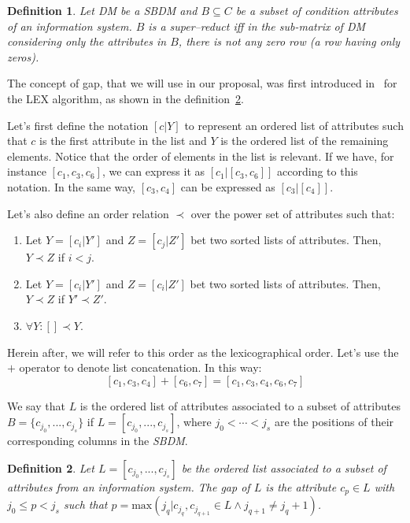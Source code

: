 \documentclass[number,preprint,review,12pt]{elsarticle}
\newtheorem{definition}{Definition}
\begin{document}
	\begin{definition}\label{def:testor}
		Let DM be a SBDM and $B \subseteq C$ be a subset of condition attributes of an information system. $B$ is a super--reduct iff in the sub-matrix of DM considering only the attributes in $B$, there is not any zero row (a row having only zeros).
	\end{definition}
	
	The concept of gap, that we will use in our proposal, was first introduced in~\cite{Santiesteban03} for the LEX algorithm, as shown in the definition~\ref{def:gap}.
	
	Let's first define the notation $[c|Y]$ to represent an ordered list of attributes such that $c$ is the first attribute in the list and $Y$ is the ordered list of the remaining elements. Notice that the order of elements in the list is relevant. If we have, for instance $[c_1,c_3,c_6]$, we can express it as $[c_1|[c_3,c_6]]$ according to this notation. In the same way, $[c_3,c_4]$ can be expressed as $[c_3|[c_4]]$.
	
	Let's also define an order relation $\prec$ over the power set of attributes such that:
	\begin{enumerate}
		\item Let $Y=[c_i|Y']$ and $Z=[c_j|Z']$ bet two sorted lists of attributes. Then, $Y \prec Z$ if $i<j$.
		\item Let $Y=[c_i|Y']$ and $Z=[c_i|Z']$ bet two sorted lists of attributes. Then, $Y \prec Z$ if $Y' \prec Z'$.
		\item $\forall Y:  [] \prec Y$.
	\end{enumerate}
	Herein after, we will refer to this order as the lexicographical order. Let's use the $+$ operator to denote list concatenation. In this way: $$[c_1,c_3,c_4]+[c_6,c_7]=[c_1,c_3,c_4,c_6,c_7]$$
		
	We say that $L$ is the ordered list of attributes associated to a subset of attributes $B = \lbrace c_{j_0},...,c_{j_s} \rbrace$ if $L = [c_{j_0},...,c_{j_s}]$, where $j_0<\cdots <j_s$ are the positions of their corresponding columns in the \textit{SBDM}.
	
	\begin{definition}\label{def:gap}
		Let $L = [c_{j_0},...,c_{j_s}]$ be the ordered list associated to a subset of attributes from an information system. The gap of $L$ is the attribute $c_p \in L$ with $j_0 \leq p <	j_s$ such that $p=\mathrm{max}(j_q | c_{j_q},c_{j_{q+1}} \in L \wedge j_{q+1} \neq j_q+1)$.
	\end{definition}
	
\end{document}
